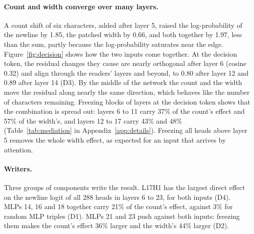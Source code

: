 \documentclass[11pt,a4paper]{article}
\begin{document}
\paragraph{Count and width converge over many layers.}
A count shift of six characters, added after layer 5, raised the log-probability of the newline by 1.85, the patched width by 0.66, and both together by 1.97, less than the sum, partly because the log-probability saturates near the edge. Figure~\ref{fig:decision} shows how the two inputs come together. At the decision token, the residual changes they cause are nearly orthogonal after layer 6 (cosine 0.32) and align through the readers' layers and beyond, to 0.80 after layer 12 and 0.89 after layer 14 (D3). By the middle of the network the count and the width move the residual along nearly the same direction, which behaves like the number of characters remaining. Freezing blocks of layers at the decision token shows that the combination is spread out: layers 6 to 11 carry 37\% of the count's effect and 57\% of the width's, and layers 12 to 17 carry 43\% and 48\% (Table~\ref{tab:mediation} in Appendix~\ref{app:details}). Freezing all heads above layer 5 removes the whole width effect, as expected for an input that arrives by attention.

\paragraph{Writers.}
Three groups of components write the result. L17H1 has the largest direct effect on the newline logit of all 288 heads in layers 6 to 23, for both inputs (D4). MLPs 14, 16 and 18 together carry 21\% of the count's effect, against 3\% for random MLP triples (D1). MLPs 21 and 23 push against both inputs: freezing them makes the count's effect 36\% larger and the width's 44\% larger (D2).
\end{document}
